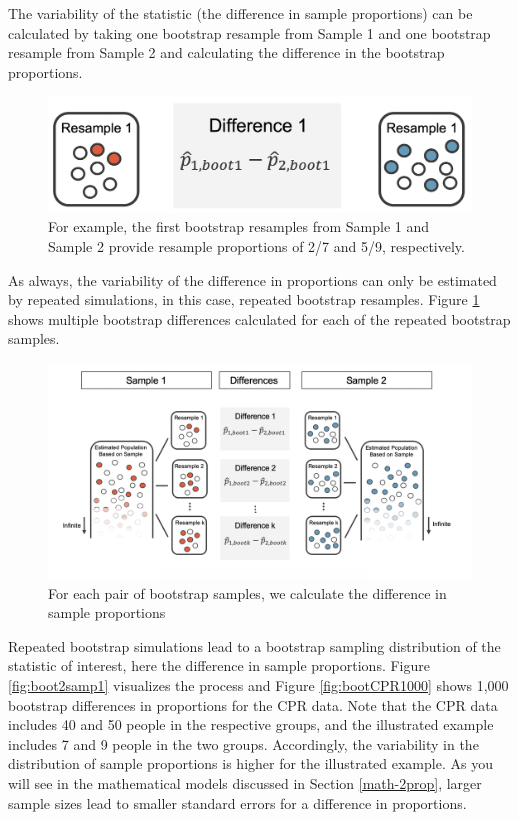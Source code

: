 \documentclass[
  10pt,
  openany]{book}
\begin{document}
The variability of the statistic (the difference in sample proportions) can be calculated by taking one bootstrap resample from Sample 1 and one bootstrap resample from Sample 2 and calculating the difference in the bootstrap proportions.

\begin{figure}[h]

{\centering \includegraphics[width=0.6\linewidth]{images/boot2prop3} 

}

\caption{For example, the first bootstrap resamples from Sample 1 and Sample 2 provide resample proportions of 2/7 and 5/9, respectively.}\label{fig:boot2samp2}
\end{figure}

\clearpage

As always, the variability of the difference in proportions can only be estimated by repeated simulations, in this case, repeated bootstrap resamples.
Figure \ref{fig:boot2samp2} shows multiple bootstrap differences calculated for each of the repeated bootstrap samples.

\begin{figure}[h]

{\centering \includegraphics[width=1\linewidth]{images/boot2prop2} 

}

\caption{For each pair of bootstrap samples, we calculate the difference in sample proportions}\label{fig:boot2samp3}
\end{figure}

Repeated bootstrap simulations lead to a bootstrap sampling distribution of the statistic of interest, here the difference in sample proportions.
Figure \ref{fig:boot2samp1} visualizes the process and Figure \ref{fig:bootCPR1000} shows 1,000 bootstrap differences in proportions for the CPR data.
Note that the CPR data includes 40 and 50 people in the respective groups, and the illustrated example includes 7 and 9 people in the two groups.
Accordingly, the variability in the distribution of sample proportions is higher for the illustrated example.
As you will see in the mathematical models discussed in Section \ref{math-2prop}, larger sample sizes lead to smaller standard errors for a difference in proportions.
\end{document}
